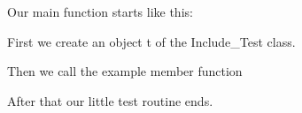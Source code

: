  Our main function starts like this\+: 
\begin{DoxyCodeInclude}{0}

\end{DoxyCodeInclude}
 First we create an object {\ttfamily t} of the Include\+\_\+\+Test class. 
\begin{DoxyCodeInclude}{0}

\end{DoxyCodeInclude}
 Then we call the example member function 
\begin{DoxyCodeInclude}{0}

\end{DoxyCodeInclude}
 After that our little test routine ends. 
\begin{DoxyCodeInclude}{0}

\end{DoxyCodeInclude}
 